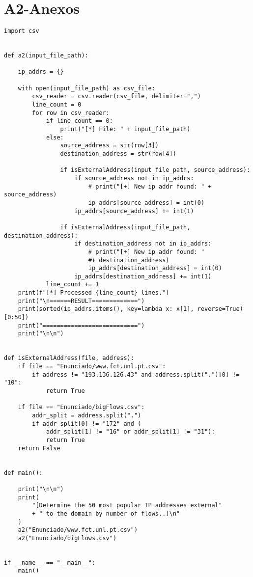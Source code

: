 \chapter{A2-Anexos}
\begin{lstlisting}
import csv


def a2(input_file_path):

    ip_addrs = {}

    with open(input_file_path) as csv_file:
        csv_reader = csv.reader(csv_file, delimiter=",")
        line_count = 0
        for row in csv_reader:
            if line_count == 0:
                print("[*] File: " + input_file_path)
            else:
                source_address = str(row[3])
                destination_address = str(row[4])

                if isExternalAddress(input_file_path, source_address):
                    if source_address not in ip_addrs:
                        # print("[+] New ip addr found: " + source_address)
                        ip_addrs[source_address] = int(0)
                    ip_addrs[source_address] += int(1)

                if isExternalAddress(input_file_path, destination_address):
                    if destination_address not in ip_addrs:
                        # print("[+] New ip addr found: " 
                        #+ destination_address)
                        ip_addrs[destination_address] = int(0)
                    ip_addrs[destination_address] += int(1)
            line_count += 1
    print(f"[*] Processed {line_count} lines.")
    print("\n======RESULT=============")
    print(sorted(ip_addrs.items(), key=lambda x: x[1], reverse=True)[0:50])
    print("===========================")
    print("\n\n")


def isExternalAddress(file, address):
    if file == "Enunciado/www.fct.unl.pt.csv":
        if address != "193.136.126.43" and address.split(".")[0] != "10":
            return True

    if file == "Enunciado/bigFlows.csv":
        addr_split = address.split(".")
        if addr_split[0] != "172" and (
            addr_split[1] != "16" or addr_split[1] != "31"):
            return True
    return False


def main():

    print("\n\n")
    print(
        "[Determine the 50 most popular IP addresses external"
        + " to the domain by number of flows..]\n"
    )
    a2("Enunciado/www.fct.unl.pt.csv")
    a2("Enunciado/bigFlows.csv")


if __name__ == "__main__":
    main()

\end{lstlisting}

